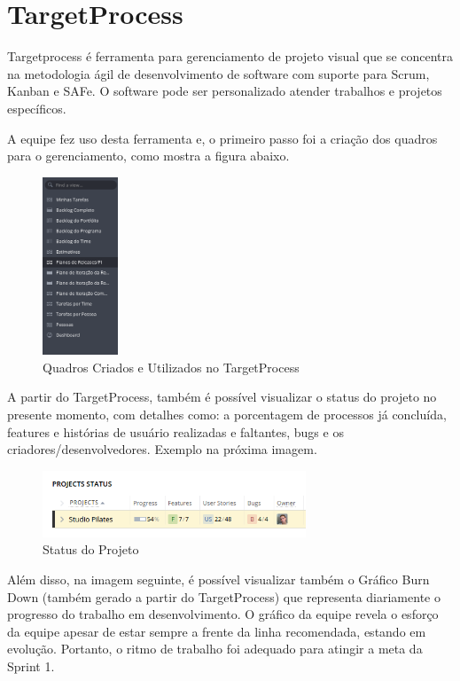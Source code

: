 \section[TargetProcess]{TargetProcess}
Targetprocess é ferramenta para gerenciamento de projeto visual que se concentra na metodologia ágil de desenvolvimento de software com suporte para Scrum, Kanban e SAFe. O software pode ser personalizado atender trabalhos e projetos específicos. 

A equipe fez uso desta ferramenta e, o primeiro passo foi a criação dos quadros para o gerenciamento, como mostra a figura abaixo.

\begin{figure}[!htb]
    \centering
    \includegraphics[width=0.2\textwidth]{figuras/quadros.png}
    \caption{Quadros Criados e Utilizados no TargetProcess}
    \label{fig:quadros}
\end{figure}

A partir do TargetProcess, também é possível visualizar o status do projeto no presente momento, com detalhes como: a porcentagem de processos já concluída, features e histórias de usuário realizadas e faltantes, bugs e os criadores/desenvolvedores. Exemplo na próxima imagem.

\begin{figure}[!htb]
    \centering
    \includegraphics[width=0.7\textwidth]{figuras/status_projeto.png}
    \caption{Status do Projeto}
    \label{fig:status_projeto}
\end{figure}

Além disso, na imagem seguinte, é possível visualizar também o Gráfico Burn Down (também gerado a partir do TargetProcess) que representa diariamente o progresso do trabalho em desenvolvimento. O gráfico da equipe revela o esforço da equipe apesar de estar sempre a frente da linha recomendada, estando em evolução. Portanto, o ritmo de trabalho foi adequado para atingir a meta da Sprint 1.

